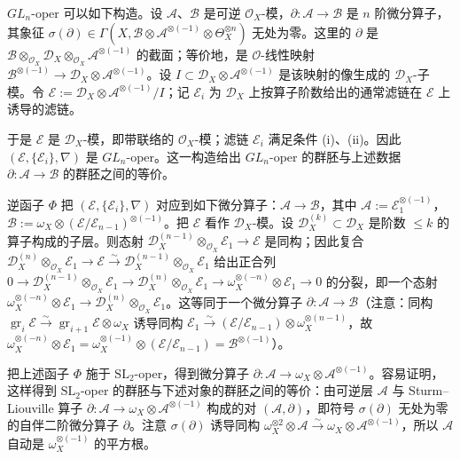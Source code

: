 $GL_n$-oper 可以如下构造。设 $\mathcal{A}$、$\mathcal{B}$ 是可逆 $\mathcal{O}_X$-模，$\partial: \mathcal{A} \to \mathcal{B}$ 是 $n$ 阶微分算子，其象征 $\sigma(\partial) \in \Gamma(X,\mathcal{B}\otimes\mathcal{A}^{\otimes(-1)}\otimes\Theta_X^{\otimes n})$ 无处为零。这里的 $\partial$ 是 $\mathcal{B}\otimes_{\mathcal{O}_X}\mathcal{D}_X\otimes_{\mathcal{O}_X}\mathcal{A}^{\otimes(-1)}$ 的截面；等价地，是 $\mathcal{O}$-线性映射 $\mathcal{B}^{\otimes(-1)} \to \mathcal{D}_X\otimes\mathcal{A}^{\otimes(-1)}$。设 $I \subset \mathcal{D}_X\otimes\mathcal{A}^{\otimes(-1)}$ 是该映射的像生成的 $\mathcal{D}_X$-子模。令 $\mathcal{E} := \mathcal{D}_X\otimes\mathcal{A}^{\otimes(-1)}/I$；记 $\mathcal{E}_i$ 为 $\mathcal{D}_X$ 上按算子阶数给出的通常滤链在 $\mathcal{E}$ 上诱导的滤链。

于是 $\mathcal{E}$ 是 $\mathcal{D}_X$-模，即带联络的 $\mathcal{O}_X$-模；滤链 $\mathcal{E}_i$ 满足条件 (i)、(ii)。因此 $(\mathcal{E},\{\mathcal{E}_i\},\nabla)$ 是 $GL_n$-oper。这一构造给出 $GL_n$-oper 的群胚与上述数据 $\partial: \mathcal{A} \to \mathcal{B}$ 的群胚之间的等价。

逆函子 $\Phi$ 把 $(\mathcal{E},\{\mathcal{E}_i\},\nabla)$ 对应到如下微分算子：$\mathcal{A} \to \mathcal{B}$，其中 $\mathcal{A} := \mathcal{E}_1^{\otimes(-1)}$，$\mathcal{B} := \omega_X\otimes(\mathcal{E}/\mathcal{E}_{n-1})^{\otimes(-1)}$。把 $\mathcal{E}$ 看作 $\mathcal{D}_X$-模。设 $\mathcal{D}_X^{(k)} \subset \mathcal{D}_X$ 是阶数 $\le k$ 的算子构成的子层。则态射 $\mathcal{D}_X^{(n-1)}\otimes_{\mathcal{O}_X}\mathcal{E}_1 \to \mathcal{E}$ 是同构；因此复合 $\mathcal{D}_X^{(n)}\otimes_{\mathcal{O}_X}\mathcal{E}_1 \to \mathcal{E} \xrightarrow{\sim} \mathcal{D}_X^{(n-1)}\otimes_{\mathcal{O}_X}\mathcal{E}_1$ 给出正合列 $0 \to \mathcal{D}_X^{(n-1)}\otimes_{\mathcal{O}_X}\mathcal{E}_1 \to \mathcal{D}_X^{(n)}\otimes_{\mathcal{O}_X}\mathcal{E}_1 \to \omega_X^{\otimes(-n)}\otimes\mathcal{E}_1 \to 0$ 的分裂，即一个态射 $\omega_X^{\otimes(-n)}\otimes\mathcal{E}_1 \to \mathcal{D}_X^{(n)}\otimes_{\mathcal{O}_X}\mathcal{E}_1$。这等同于一个微分算子 $\partial: \mathcal{A} \to \mathcal{B}$（注意：同构 $\operatorname{gr}_i\mathcal{E} \xrightarrow{\sim} \operatorname{gr}_{i+1}\mathcal{E}\otimes\omega_X$ 诱导同构 $\mathcal{E}_1 \xrightarrow{\sim} (\mathcal{E}/\mathcal{E}_{n-1})\otimes\omega_X^{\otimes(n-1)}$，故 $\omega_X^{\otimes(-n)}\otimes\mathcal{E}_1 = \omega_X^{\otimes(-1)}\otimes(\mathcal{E}/\mathcal{E}_{n-1}) = \mathcal{B}^{\otimes(-1)}$）。

把上述函子 $\Phi$ 施于 $\mathrm{SL}_2$-oper，得到微分算子 $\partial: \mathcal{A} \to \omega_X\otimes\mathcal{A}^{\otimes(-1)}$。容易证明，这样得到 $\mathrm{SL}_2$-oper 的群胚与下述对象的群胚之间的等价：由可逆层 $\mathcal{A}$ 与 Sturm--Liouville 算子 $\partial: \mathcal{A} \to \omega_X\otimes\mathcal{A}^{\otimes(-1)}$ 构成的对 $(\mathcal{A},\partial)$，即符号 $\sigma(\partial)$ 无处为零的自伴二阶微分算子 $\partial$。注意 $\sigma(\partial)$ 诱导同构 $\omega_X^{\otimes 2}\otimes\mathcal{A} \xrightarrow{\sim} \omega_X\otimes\mathcal{A}^{\otimes(-1)}$，所以 $\mathcal{A}$ 自动是 $\omega_X^{\otimes(-1)}$ 的平方根。

